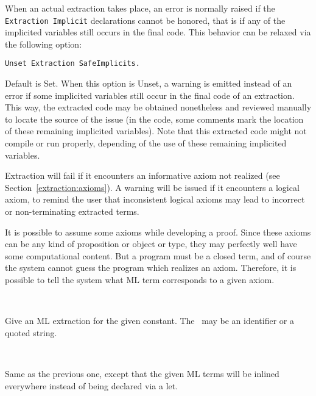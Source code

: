 When an actual extraction takes place, an error is normally raised if the
{\tt Extraction Implicit}
declarations cannot be honored, that is if any of the implicited
variables still occurs in the final code. This behavior can be relaxed
via the following option:

\begin{description}
\item {} {\tt Unset Extraction SafeImplicits.}

Default is Set. When this option is Unset, a warning is emitted
instead of an error if some implicited variables still occur in the
final code of an extraction. This way, the extracted code may be
obtained nonetheless and reviewed manually to locate the source of the issue
(in the code, some comments mark the location of these remaining
implicited variables).
Note that this extracted code might not compile or run properly,
depending of the use of these remaining implicited variables.

\end{description}

\label{extraction:axioms}

Extraction will fail if it encounters an informative
axiom not realized (see Section~\ref{extraction:axioms}). 
A warning will be issued if it encounters a logical axiom, to remind the
user that inconsistent logical axioms may lead to incorrect or
non-terminating extracted terms. 

It is possible to assume some axioms while developing a proof. Since
these axioms can be any kind of proposition or object or type, they may
perfectly well have some computational content. But a program must be
a closed term, and of course the system cannot guess the program which
realizes an axiom.  Therefore, it is possible to tell the system
what ML term corresponds to a given axiom. 

\begin{description}
\item{} ~\par
  Give an ML extraction for the given constant.
  The \str\ may be an identifier or a quoted string.
\item{} ~\par
  Same as the previous one, except that the given ML terms will
  be inlined everywhere instead of being declared via a let.
\end{description}

